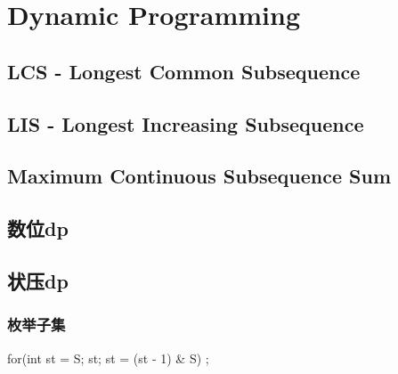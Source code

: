 \section{Dynamic Programming}
	\subsection{LCS - Longest Common Subsequence}
		
	\subsection{LIS - Longest Increasing Subsequence}
		
	\subsection{Maximum Continuous Subsequence Sum}
		
	\subsection{数位dp}
		
	\subsection{状压dp}
		\subsubsection{枚举子集}
			for(int st = S; st; st = (st - 1) \& S) ;
